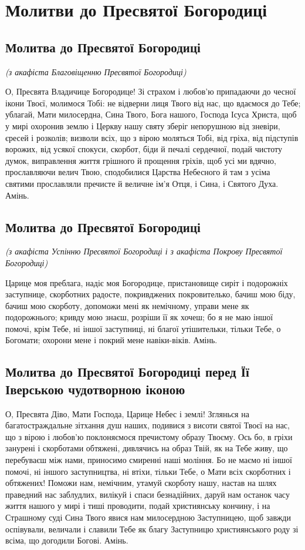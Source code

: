 \documentclass[chapters.tex]{subfiles}
\begin{document}
\chapter{Молитви до Пресвятої Богородиці}
\section{Молитва до Пресвятої Богородиці}
\emph{(з акафіста Благовіщенню Пресвятої Богородиці)}

О, Пресвята Владичице Богородице! Зі страхом і любов’ю припадаючи до чесної ікони Твоєї, молимося Тобі: не відверни лиця Твого від нас, що вдаємося до Тебе; ублагай, Мати милосердна, Сина Твого, Бога нашого, Господа Ісуса Христа, щоб у мирі охоронив землю і Церкву нашу святу зберіг непорушною від зневіри, єресей і розколів; визволи всіх, що з вірою моляться Тобі, від гріха, від підступів ворожих, від усякої спокуси, скорбот, біди й печалі сердечної, подай чистоту думок, виправлення життя грішного й прощення гріхів, щоб усі ми вдячно, прославляючи велич Твою, сподобилися Царства Небесного й там з усіма святими прославляли пречисте й величне ім’я Отця, і Сина, і Святого Духа. Амінь.

\section{Молитва до Пресвятої Богородиці}
\emph{(з акафіста Успінню Пресвятої Богородиці і з акафіста Покрову Пресвятої Богородиці)}

Царице моя преблага, надіє моя Богородице, пристановище сиріт і подорожніх заступнице, скорботних радосте, покривджених покровителько, бачиш мою біду, бачиш мою скорботу, допоможи мені як немічному, управи мене як подорожнього; кривду мою знаєш, розріши її як хочеш; бо я не маю іншої помочі, крім Тебе, ні іншої заступниці, ні благої утішительки, тільки Тебе, о Богомати; охорони мене і покрий мене навіки-віків. Амінь.

\section{Молитва до Пресвятої Богородиці перед Її Іверською чудотворною іконою}
О, Пресвята Діво, Мати Господа, Царице Небес і землі! Зглянься на багатостраждальне зітхання душ наших, подивися з висоти святої Твоєї на нас, що з вірою і любов’ю поклоняємося пречистому образу Твоєму. Ось бо, в гріхи занурені і скорботами обтяжені, дивлячись на образ Твій, як на Тебе живу, що перебуваєш між нами, приносимо смиренні наші моління. Бо не маємо ні іншої помочі, ні іншого заступництва, ні втіхи, тільки Тебе, о Мати всіх скорботних і обтяжених! Поможи нам, немічним, утамуй скорботу нашу, настав на шлях праведний нас заблудлих, вилікуй і спаси безнадійних, даруй нам останок часу життя нашого у мирі і тиші проводити, подай християнську кончину, і на Страшному суді Сина Твого явися нам милосердною Заступницею, щоб завжди оспівували, величали і славили Тебе як благу Заступницю християнського роду зі всіма, що догодили Богові. Амінь.
\end{document}
